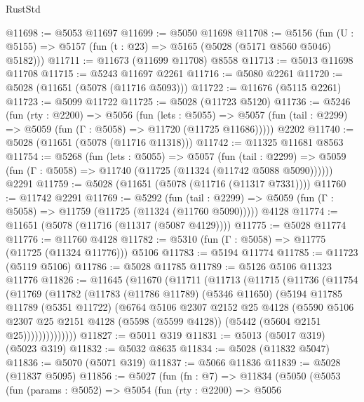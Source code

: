 \begin{lexlean}{RustStd}
\begin{coremodule}
@11698 := @5053 @11697
@11699 := @5050 @11698
@11708 := @5156
    (fun (U : @5155) => @5157 (fun (t : @23) => @5165 (@5028 (@5171 @8560 @5046) @5182)))
@11711 := @11673 (@11699 @11708) @8558
@11713 := @5013 @11698 @11708
@11715 := @5243 @11697 @2261
@11716 := @5080 @2261
@11720 := @5028 (@11651 (@5078 (@11716 @5093)))
@11722 := @11676 (@5115 @2261)
@11723 := @5099 @11722
@11725 := @5028 (@11723 @5120)
@11736 := @5246
    (fun (rty : @2200) =>
    @5056
      (fun (lets : @5055) =>
      @5057 (fun (tail : @2299) => @5059 (fun (Γ : @5058) => @11720 (@11725 @11686)))))
    @2202
@11740 := @5028 (@11651 (@5078 (@11716 @11318)))
@11742 := @11325 @11681 @8563
@11754 := @5268
    (fun (lets : @5055) =>
    @5057
      (fun (tail : @2299) =>
      @5059 (fun (Γ : @5058) => @11740 (@11725 (@11324 (@11742 @5088 @5090))))))
    @2291
@11759 := @5028 (@11651 (@5078 (@11716 (@11317 @7331))))
@11760 := @11742 @2291
@11769 := @5292
    (fun (tail : @2299) => @5059 (fun (Γ : @5058) => @11759 (@11725 (@11324 (@11760 @5090)))))
    @4128
@11774 := @11651 (@5078 (@11716 (@11317 (@5087 @4129))))
@11775 := @5028 @11774
@11776 := @11760 @4128
@11782 := @5310 (fun (Γ : @5058) => @11775 (@11725 (@11324 @11776))) @5106
@11783 := @5194 @11774
@11785 := @11723 (@5119 @5106)
@11786 := @5028 @11785
@11789 := @5126 @5106 @11323 @11776
@11826 := @11645
    (@11670
      (@11711
        (@11713
          (@11715
            (@11736
              (@11754
                (@11769
                  (@11782
                    (@11783
                      (@11786 @11789)
                      (@5346 @11650)
                      (@5194
                        @11785
                        @11789
                        (@5351 @11722)
                        (@6764
                          @5106
                          @2307
                          @2152
                          @25
                          @4128
                          (@5590
                            @5106
                            @2307
                            @25
                            @2151
                            @4128
                            (@5598 (@5599 @4128))
                            (@5442 (@5604 @2151 @25))))))))))))))
@11827 := @5011 @319
@11831 := @5013 (@5017 @319) (@5023 @319)
@11832 := @5032 @8635
@11834 := @5028 (@11832 @5047)
@11836 := @5070 (@5071 @319)
@11837 := @5066 @11836
@11839 := @5028 (@11837 @5095)
@11856 := @5027
    (fun (fn : @7) =>
    @11834
      (@5050
        (@5053
          (fun (params : @5052) =>
          @5054
            (fun (rty : @2200) =>
            @5056

\end{coremodule}
\end{lexlean}
